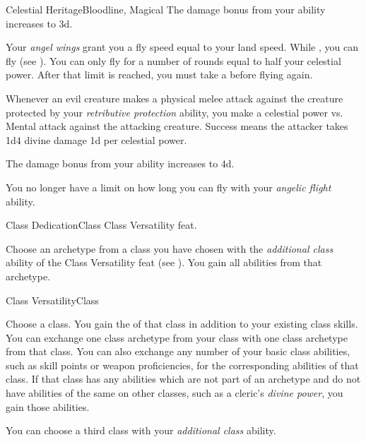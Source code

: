 \begin{feat}{Celestial Heritage}{Bloodline, Magical}
         The damage bonus from your  ability increases to \plus3d.

         Your \textit{angel wings} grant you a fly speed equal to your land speed.
        While \unencumbered, you can fly (see ).
        You can only fly for a number of rounds equal to half your celestial power.
        After that limit is reached, you must take a  before flying again.

         Whenever an evil creature makes a physical melee attack against the creature protected by your \textit{retributive protection} ability, you make a celestial power vs. Mental attack against the attacking creature.
        Success means the attacker takes 1d4 divine damage \plus1d per celestial power.

         The damage bonus from your  ability increases to \plus4d.

        \ff[17]{} %

         You no longer have a limit on how long you can fly with your \textit{angelic flight} ability.
    \end{feat}

    \begin{feat}{Class Dedication}{Class}
        \featpre Class Versatility feat.
        \featben

         Choose an archetype from a class you have chosen with the \textit{additional class} ability of the Class Versatility feat (see ).
        You gain all abilities from that archetype.

    \end{feat}

    \begin{feat}{Class Versatility}{Class}
        \featben

         Choose a class.
        You gain the  of that class in addition to your existing class skills.
        You can exchange one class archetype from your class with one class archetype from that class.
        You can also exchange any number of your basic class abilities, such as skill points or weapon proficiencies, for the corresponding abilities of that class.
        If that class has any abilities which are not part of an archetype and do not have abilities of the same on other classes, such as a cleric's \textit{divine power}, you gain those abilities.

         You can choose a third class with your \textit{additional class} ability.
        
    \end{feat}

